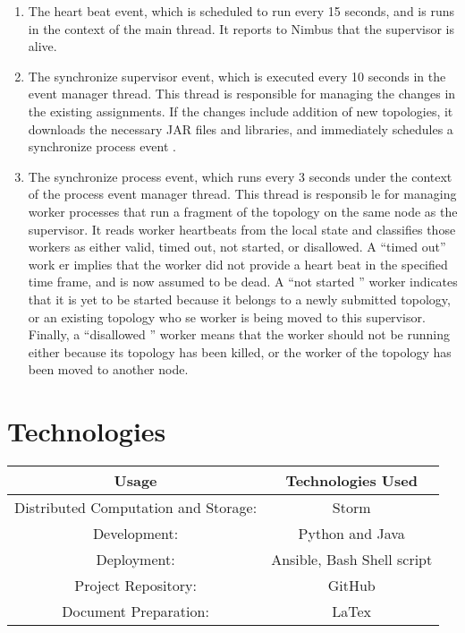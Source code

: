 \documentclass[9pt,twocolumn,twoside]{../../styles/osajnl}
\begin{document}
\begin{enumerate}
\item The heart beat event, which is scheduled to run every 15
  seconds, and is runs in the context of the main thread. It reports
  to Nimbus that the supervisor is alive.
\item The synchronize supervisor event, which is executed every 10
  seconds in the event manager thread. This thread is responsible for
  managing the changes in the existing assignments. If the changes
  include addition of new topologies, it downloads the necessary JAR
  files and libraries, and immediately schedules a synchronize process
  event .
\item The synchronize process event, which runs every 3 seconds under
  the context of the process event manager thread. This thread is
  responsib le for managing worker processes that run a fragment of
  the topology on the same node as the supervisor. It reads worker
  heartbeats from the local state and classifies those workers as
  either valid, timed out, not started, or disallowed. A “timed out”
  work er implies that the worker did not provide a heart beat in the
  specified time frame, and is now assumed to be dead. A “not started
  ” worker indicates that it is yet to be started because it belongs
  to a newly submitted topology, or an existing topology who se worker
  is being moved to this supervisor. Finally, a “disallowed ” worker
  means that the worker should not be running either because its
  topology has been killed, or the worker of the topology has been
  moved to another node.
\end{enumerate}





\section{Technologies}




\begin{center}
 \begin{tabular}{||c c||} 
 \hline
 Usage & Technologies Used\\ [0.5ex]
 \hline\hline
 Distributed Computation and Storage:& Storm \\ 
 \hline
 Development: &Python and Java\\
 \hline
 Deployment: &Ansible, Bash Shell script\\
 \hline
 Project Repository: &GitHub \\
 \hline
 Document Preparation: &LaTex\\ [1ex] 
 \hline
\end{tabular}
\end{center}
\end{document}
